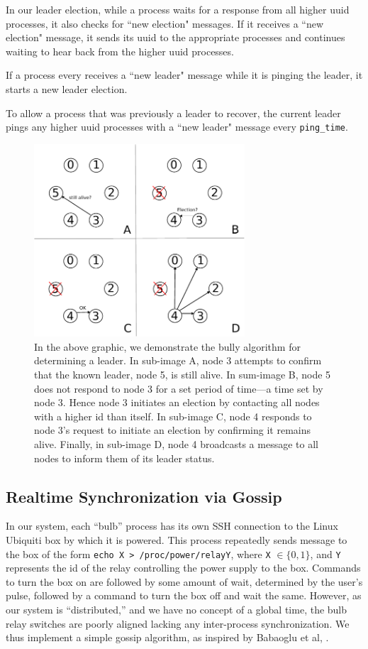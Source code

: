 \documentclass[preprint,review,12pt]{cs262}
\begin{document}
In our leader election, while a process waits for a response from all higher uuid processes, it also checks for ``new election" messages. If it receives a ``new election" message, it sends its uuid to the appropriate processes and continues waiting to hear back from the higher uuid processes.

If a process every receives a ``new leader" message while it is pinging the leader, it starts a new leader election.

To allow a process that was previously a leader to recover, the current leader pings any higher uuid processes with a ``new leader" message every \texttt{ping\_time}.

\begin{figure}[h]
  \centering
  \includegraphics[width=0.7\textwidth]{figures/bully}
  \caption{In the above graphic, we demonstrate the bully algorithm for determining a leader. In sub-image A, node 3 attempts to confirm that the known leader, node 5, is still alive. In sum-image B, node 5 does not respond to node 3 for a set period of time---a time set by node 3. Hence node 3 initiates an election by contacting all nodes with a higher id than itself. In sub-image C, node 4 responds to node 3's request to initiate an election by confirming it remains alive. Finally, in sub-image D, node 4 broadcasts a message to all nodes to inform them of its leader status. 
 \label{fig:bully}}
\end{figure} 


\subsection{Realtime Synchronization via Gossip}

In our system, each ``bulb'' process has its own SSH connection to the Linux Ubiquiti box by which it is powered. This process repeatedly sends message to the box of the form \texttt{echo X > /proc/power/relayY}, where \texttt{X} $\in \{0,1\}$, and \texttt{Y} represents the id of the relay controlling the power supply to the box. Commands to turn the box on are followed by some amount of wait, determined by the user's pulse, followed by a command to turn the box off and wait the same. However, as our system is ``distributed,'' and we have no concept of a global time, the bulb relay switches are poorly aligned lacking any inter-process synchronization. We thus implement a simple gossip algorithm, as inspired by Babaoglu et al, \cite{babaoglu2007firefly}. 
\end{document}
